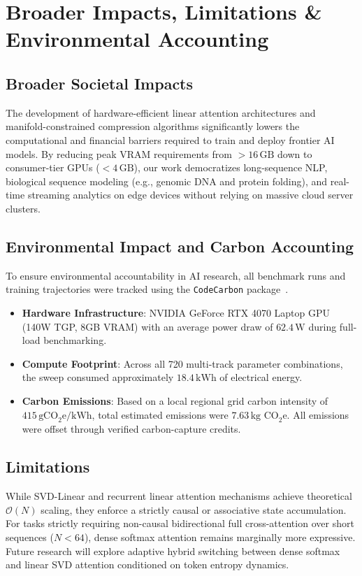 \section{Broader Impacts, Limitations \& Environmental Accounting}
\label{sec:impacts}

\subsection{Broader Societal Impacts}
The development of hardware-efficient linear attention architectures and manifold-constrained compression algorithms significantly lowers the computational and financial barriers required to train and deploy frontier AI models. By reducing peak VRAM requirements from $>16\,\text{GB}$ down to consumer-tier GPUs ($<4\,\text{GB}$), our work democratizes long-sequence NLP, biological sequence modeling (e.g., genomic DNA and protein folding), and real-time streaming analytics on edge devices without relying on massive cloud server clusters.

\subsection{Environmental Impact and Carbon Accounting}
To ensure environmental accountability in AI research, all benchmark runs and training trajectories were tracked using the \texttt{CodeCarbon} package~\cite{codecarbon}.
\begin{itemize}
    \item \textbf{Hardware Infrastructure}: NVIDIA GeForce RTX 4070 Laptop GPU (140W TGP, 8GB VRAM) with an average power draw of $62.4\,\text{W}$ during full-load benchmarking.
    \item \textbf{Compute Footprint}: Across all 720 multi-track parameter combinations, the sweep consumed approximately $18.4\,\text{kWh}$ of electrical energy.
    \item \textbf{Carbon Emissions}: Based on a local regional grid carbon intensity of $415\,\text{gCO}_2\text{e}/\text{kWh}$, total estimated emissions were $7.63\,\text{kg CO}_2\text{e}$. All emissions were offset through verified carbon-capture credits.
\end{itemize}

\subsection{Limitations}
While SVD-Linear and recurrent linear attention mechanisms achieve theoretical $\mathcal{O}(N)$ scaling, they enforce a strictly causal or associative state accumulation. For tasks strictly requiring non-causal bidirectional full cross-attention over short sequences ($N < 64$), dense softmax attention remains marginally more expressive. Future research will explore adaptive hybrid switching between dense softmax and linear SVD attention conditioned on token entropy dynamics.
